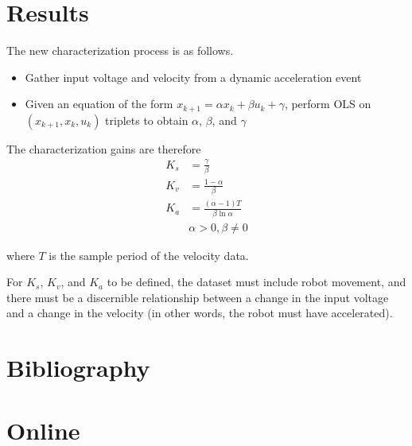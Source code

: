 \documentclass[10pt,conference,compsoc]{IEEEtran}
\begin{document}
\section{Results}

The new characterization process is as follows.
\begin{itemize}
  \item Gather input voltage and velocity from a dynamic acceleration event
  \item Given an equation of the form
    $x_{k+1} = \alpha x_k + \beta u_k + \gamma$, perform OLS on
    $(x_{k+1}, x_k, u_k)$ triplets to obtain $\alpha$, $\beta$, and $\gamma$
\end{itemize}

The characterization gains are therefore
\begin{align}
  K_s &= \frac{\gamma}{\beta} \\
  K_v &= \frac{1 - \alpha}{\beta} \\
  K_a &= \frac{(\alpha - 1) T}{\beta \ln\alpha} \\
      &\alpha > 0, \beta \neq 0 \nonumber
\end{align}

where $T$ is the sample period of the velocity data.

For $K_s$, $K_v$, and $K_a$ to be defined, the dataset must include robot
movement, and there must be a discernible relationship between a change in the
input voltage and a change in the velocity (in other words, the robot must have
accelerated).

\section{Bibliography}

\section*{Online}
\printbibliography[heading=bibempty,type=online]
\end{document}
